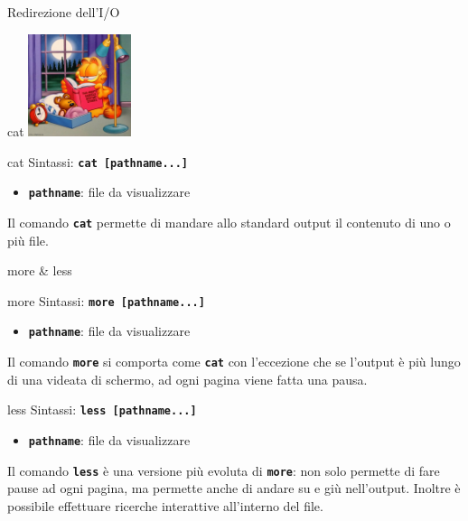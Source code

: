 \documentclass{beamer}
\begin{document}
    \begin{frame}{Redirezione dell'I/O}
    \end{frame}

    \begin{frame}{cat}
        \centering
        \includegraphics[height=3cm, keepaspectratio]{images/garfield.jpg}

        \begin{block}{cat}
            Sintassi: \texttt{\textbf{cat [pathname...]}}

            \begin{itemize}
                \item \texttt{\textbf{pathname}}: file da visualizzare
            \end{itemize}

            Il comando \texttt{\textbf{cat}} permette di mandare allo standard output il contenuto di uno o più file.
        \end{block}
    \end{frame}

    \begin{frame}{more \& less}
        \begin{block}{more}
            Sintassi: \texttt{\textbf{more [pathname...]}}

            \begin{itemize}
                \item \texttt{\textbf{pathname}}: file da visualizzare
            \end{itemize}

            Il comando \texttt{\textbf{more}} si comporta come \texttt{\textbf{cat}} con
            l'eccezione che se l'output è più lungo di una videata di schermo, ad ogni pagina viene fatta una pausa.
        \end{block}

        \begin{block}{less}
            Sintassi: \texttt{\textbf{less [pathname...]}}

            \begin{itemize}
                \item \texttt{\textbf{pathname}}: file da visualizzare
            \end{itemize}

            Il comando \texttt{\textbf{less}} è una versione più evoluta di \texttt{\textbf{more}}: non solo permette di
            fare pause ad ogni pagina, ma permette anche di andare su e giù
            nell’output. Inoltre è possibile effettuare ricerche interattive
            all’interno del file.
        \end{block}
    \end{frame}
\end{document}
